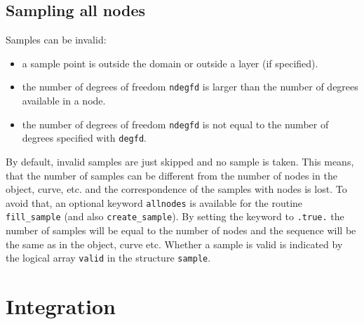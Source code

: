 \subsection{Sampling all nodes}

Samples can be invalid:
\begin{itemize}
   \item a sample point is outside the domain or outside a layer (if
         specified).
   \item the number of degrees of freedom \texttt{ndegfd} is larger than the
number of degrees available in a node.
   \item the number of degrees of freedom \texttt{ndegfd} is not equal to the
number of degrees specified with \texttt{degfd}.
\end{itemize}
By default, invalid samples are just skipped and no sample is taken. This
means, that the number of samples can be different from the number of nodes in
the object, curve, etc. and the correspondence of the samples with nodes is
lost. To avoid that, an optional keyword \texttt{allnodes} is available for
the routine
\texttt{fill\_sample} (and also \texttt{create\_sample}). By setting the
keyword to \texttt{.true.} the number of samples will be equal to the number of
nodes and the sequence will be the same as in the object, curve etc. Whether a
sample is valid is indicated by the logical array \texttt{valid} in the
structure \texttt{sample}.

\section{Integration}
\label{sec:integration}

